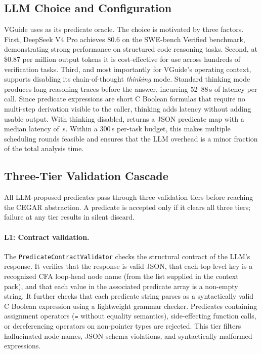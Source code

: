 \subsection{LLM Choice and Configuration}

VGuide uses \LLMName{} as its predicate oracle. The choice is motivated by three
factors. First, DeepSeek V4 Pro achieves 80.6 on the SWE-bench Verified benchmark,
demonstrating strong performance on structured code reasoning tasks. Second, at
\$0.87 per million output tokens it is cost-effective for use across hundreds of
verification tasks. Third, and most importantly for VGuide's operating context,
\LLMName{} supports disabling its chain-of-thought \emph{thinking} mode. Standard
thinking mode produces long reasoning traces before the answer, incurring 52--88\,s
of latency per call. Since predicate expressions are short C Boolean formulas that
require no multi-step derivation visible to the caller, thinking adds latency without
adding usable output. With thinking disabled, \LLMName{} returns a JSON predicate
map with a median latency of \LLMLatencyMedian{}\,s. Within a 300\,s per-task
budget, this makes multiple scheduling rounds feasible and ensures that the LLM
overhead is a minor fraction of the total analysis time.

\subsection{Three-Tier Validation Cascade}

All LLM-proposed predicates pass through three validation tiers before reaching the
CEGAR abstraction. A predicate is accepted only if it clears all three tiers; failure
at any tier results in silent discard.

\paragraph{L1: Contract validation.} The \texttt{PredicateContractValidator} checks
the structural contract of the LLM's response. It verifies that the response is valid
JSON, that each top-level key is a recognized CFA loop-head node name (from the list
supplied in the context pack), and that each value in the associated predicate array is
a non-empty string. It further checks that each predicate string parses as a syntactically
valid C Boolean expression using a lightweight grammar checker. Predicates containing
assignment operators (\texttt{=} without equality semantics), side-effecting function
calls, or dereferencing operators on non-pointer types are rejected. This tier filters
hallucinated node names, JSON schema violations, and syntactically malformed expressions.

